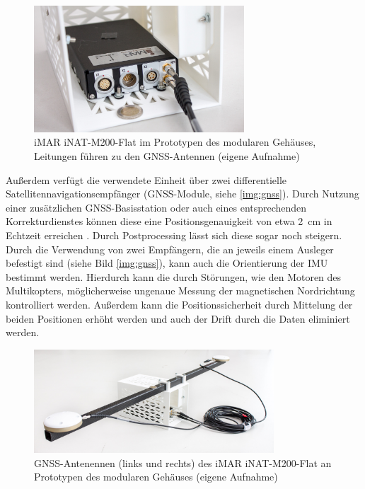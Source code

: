 \documentclass[a4paper,12pt,bibliography=totoc, listof=totoc,titlepage,pointlessnumbers]{scrreprt}
\begin{document}
\begin{figure}[!ht]
 \centering
 \includegraphics[width=0.7\textwidth]{./img/imu.jpg}
 \caption{iMAR iNAT-M200-Flat im Prototypen des modularen Gehäuses, Leitungen führen zu den GNSS-Antennen (eigene Aufnahme)}
 \label{img:imu}
\end{figure}

Außerdem verfügt die verwendete Einheit über zwei differentielle Satellitennavigationsempfänger (GNSS-Module, siehe \autoref{img:gnss}). Durch Nutzung einer zusätzlichen GNSS-Basisstation oder auch eines entsprechenden Korrekturdienstes können diese eine Positionsgenauigkeit von etwa 2~cm in Echtzeit erreichen \citep{imar}. Durch Postprocessing lässt sich diese sogar noch steigern. Durch die Verwendung von zwei Empfängern, die an jeweils einem Ausleger befestigt sind (siehe Bild \autoref{img:gnss}), kann auch die Orientierung der IMU bestimmt werden. Hierdurch kann die durch Störungen, wie den Motoren des Multikopters, möglicherweise ungenaue Messung der magnetischen Nordrichtung kontrolliert werden. Außerdem kann die Positionssicherheit durch Mittelung der beiden Positionen erhöht werden und auch der Drift durch die Daten eliminiert werden.

\begin{figure}[!ht]
 \centering
 \includegraphics[width=0.8\textwidth]{./img/gnss.jpg}
 \caption{GNSS-Antenennen (links und rechts) des iMAR iNAT-M200-Flat an Prototypen des modularen Gehäuses (eigene Aufnahme)}
 \label{img:gnss}
\end{figure}
\end{document}
